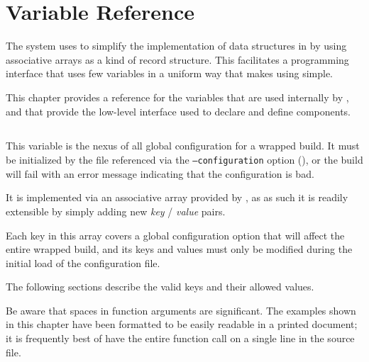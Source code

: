 %
%
%
%
\chapter{Variable Reference}

The \lmsbw system uses \gmsl to simplify the implementation of data
structures in \make by using associative arrays as a kind of record
structure.  This facilitates a programming interface that uses few
variables in a uniform way that makes using \lmsbw simple.

This chapter provides a reference for the variables that are used
internally by \lmsbw, and that provide the low-level interface used to
declare and define components.

\section{\lmsbwconfiguration}

This variable is the nexus of all global configuration for a wrapped
build.  It must be initialized by the file referenced via the \lmsbw
\texttt{--configuration} option (), or the
build will fail with an error message indicating that the
configuration is bad.

It is implemented via an associative array provided by \gmsl, as as
such it is readily extensible by simply adding new \emph{key} /
\emph{value} pairs.

Each key in this array covers a global configuration option that will
affect the entire wrapped build, and its keys and values must only be
modified during the initial load of the configuration file.

The following sections describe the valid keys and their allowed
values.

Be aware that spaces in \gnumake function arguments are significant.
The examples shown in this chapter have been formatted to be easily
readable in a printed document; it is frequently best of have the
entire function call on a single line in the source file.


